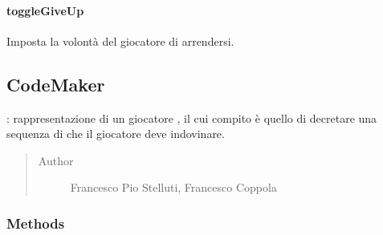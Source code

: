 \documentclass[letterpaper,10pt,italian,openany,oneside]{sphinxmanual}
\begin{document}
\paragraph{toggleGiveUp}
\label{\detokenize{test/it/unicam/cs/pa/mastermind/players/CodeBreaker:togglegiveup}}

\begin{fulllineitems}
\label{\detokenize{test/it/unicam/cs/pa/mastermind/players/CodeBreaker:it.unicam.cs.pa.mastermind.players.CodeBreaker.toggleGiveUp()}}
Imposta la volontà del giocatore  di arrendersi.

\end{fulllineitems}



\subsection{CodeMaker}
\label{\detokenize{test/it/unicam/cs/pa/mastermind/players/CodeMaker:codemaker}}\label{\detokenize{test/it/unicam/cs/pa/mastermind/players/CodeMaker::doc}}

\begin{fulllineitems}
\label{\detokenize{test/it/unicam/cs/pa/mastermind/players/CodeMaker:it.unicam.cs.pa.mastermind.players.CodeMaker}}
: rappresentazione di un giocatore , il cui compito è quello di decretare una sequenza di  che il giocatore  deve indovinare.
\begin{quote}\begin{description}
\item[{Author}] \leavevmode
Francesco Pio Stelluti, Francesco Coppola

\end{description}\end{quote}

\end{fulllineitems}



\subsubsection{Methods}
\label{\detokenize{test/it/unicam/cs/pa/mastermind/players/CodeMaker:methods}}
\end{document}
